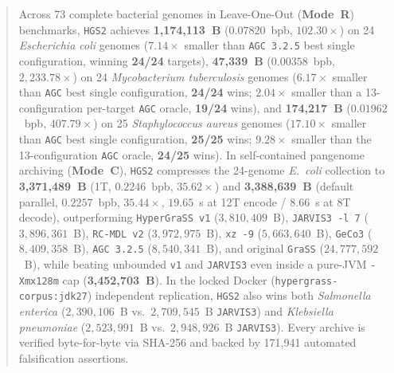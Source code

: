 \documentclass[10pt]{article}
\theoremstyle{definition}
\begin{document}
\begin{abstract}
Across 73 complete bacterial genomes in Leave-One-Out (\textbf{Mode~R}) benchmarks, \texttt{HGS2} achieves \textbf{1,174,113~B} ($0.07820$~bpb, $102.30\times$) on 24 \textit{Escherichia coli} genomes ($7.14\times$ smaller than \texttt{AGC~3.2.5} best single configuration, winning \textbf{24/24} targets), \textbf{47,339~B} ($0.00358$~bpb, $2,233.78\times$) on 24 \textit{Mycobacterium tuberculosis} genomes ($6.17\times$ smaller than \texttt{AGC} best single configuration, \textbf{24/24} wins; $2.04\times$ smaller than a 13-configuration per-target \texttt{AGC} oracle, \textbf{19/24} wins), and \textbf{174,217~B} ($0.01962$~bpb, $407.79\times$) on 25 \textit{Staphylococcus aureus} genomes ($17.10\times$ smaller than \texttt{AGC} best single configuration, \textbf{25/25} wins; $9.28\times$ smaller than the 13-configuration \texttt{AGC} oracle, \textbf{24/25} wins). In self-contained pangenome archiving (\textbf{Mode~C}), \texttt{HGS2} compresses the 24-genome \textit{E.~coli} collection to \textbf{3,371,489~B} (1T, $0.2246$~bpb, $35.62\times$) and \textbf{3,388,639~B} (default parallel, $0.2257$~bpb, $35.44\times$, $19.65$~s at 12T encode / $8.66$~s at 8T decode), outperforming \texttt{HyperGraSS v1} ($3,810,409$~B), \texttt{JARVIS3 -l 7} ($3,896,361$~B), \texttt{RC-MDL v2} ($3,972,975$~B), \texttt{xz -9} ($5,663,640$~B), \texttt{GeCo3} ($8,409,358$~B), \texttt{AGC~3.2.5} ($8,540,341$~B), and original \texttt{GraSS} ($24,777,592$~B), while beating unbounded \texttt{v1} and \texttt{JARVIS3} even inside a pure-JVM \texttt{-Xmx128m} cap (\textbf{3,452,703~B}). In the locked Docker (\texttt{hypergrass-corpus:jdk27}) independent replication, \texttt{HGS2} also wins both \textit{Salmonella enterica} ($2,390,106$~B vs.\ $2,709,545$~B \texttt{JARVIS3}) and \textit{Klebsiella pneumoniae} ($2,523,991$~B vs.\ $2,948,926$~B \texttt{JARVIS3}). Every archive is verified byte-for-byte via SHA-256 and backed by 171,941 automated falsification assertions.


\end{abstract}
\end{document}

